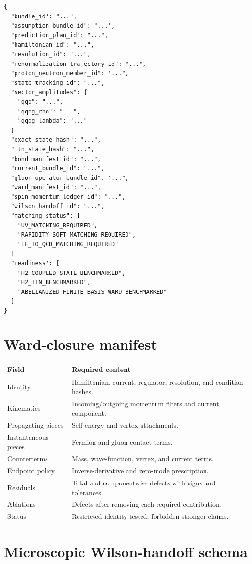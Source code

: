 \documentclass[11pt]{article}
\begin{document}
\begin{verbatim}
{
  "bundle_id": "...",
  "assumption_bundle_id": "...",
  "prediction_plan_id": "...",
  "hamiltonian_id": "...",
  "resolution_id": "...",
  "renormalization_trajectory_id": "...",
  "proton_neutron_member_id": "...",
  "state_tracking_id": "...",
  "sector_amplitudes": {
    "qqq": "...",
    "qqqg_rho": "...",
    "qqqg_lambda": "..."
  },
  "exact_state_hash": "...",
  "ttn_state_hash": "...",
  "bond_manifest_id": "...",
  "current_bundle_id": "...",
  "gluon_operator_bundle_id": "...",
  "ward_manifest_id": "...",
  "spin_momentum_ledger_id": "...",
  "wilson_handoff_id": "...",
  "matching_status": [
    "UV_MATCHING_REQUIRED",
    "RAPIDITY_SOFT_MATCHING_REQUIRED",
    "LF_TO_QCD_MATCHING_REQUIRED"
  ],
  "readiness": [
    "H2_COUPLED_STATE_BENCHMARKED",
    "H2_TTN_BENCHMARKED",
    "ABELIANIZED_FINITE_BASIS_WARD_BENCHMARKED"
  ]
}
\end{verbatim}

\section{Ward-closure manifest}

\begin{longtable}{L{0.24\textwidth}L{0.68\textwidth}}
\toprule
Field & Required content\\
\midrule
\endhead
Identity & Hamiltonian, current, regulator, resolution, and condition hashes.\\
Kinematics & Incoming/outgoing momentum fibers and current component.\\
Propagating pieces & Self-energy and vertex attachments.\\
Instantaneous pieces & Fermion and gluon contact terms.\\
Counterterms & Mass, wave-function, vertex, and current terms.\\
Endpoint policy & Inverse-derivative and zero-mode prescription.\\
Residuals & Total and componentwise defects with signs and tolerances.\\
Ablations & Defects after removing each required contribution.\\
Status & Restricted identity tested; forbidden stronger claims.\\
\bottomrule
\end{longtable}

\section{Microscopic Wilson-handoff schema}
\end{document}
